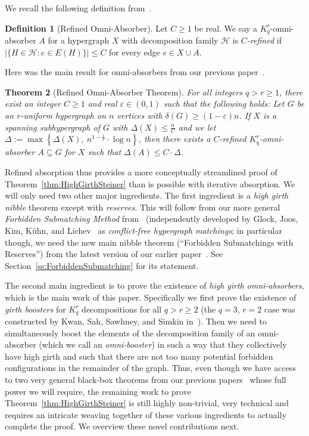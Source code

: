 \documentclass[11pt]{article}
\newcounter{i}
\theoremstyle{plain}
\newtheorem{thm}{Theorem}[section]
\theoremstyle{plain} %
\theoremstyle{definition}
\newtheorem{definition}[thm]{Definition}
\begin{document}
We recall the following definition from~\cite{DPI}.

\begin{definition}[Refined Omni-Absorber]
 Let $C\ge 1$ be real. We say a $K_q^r$-omni-absorber $A$ for a hypergraph $X$ with decomposition family $\mathcal{H}$ is \emph{$C$-refined} if $|\{H\in \mathcal{H} : e\in E(H) \}| \le C$ for every edge $e\in X\cup A$.
\end{definition}

Here was the main result for omni-absorbers from our previous paper~\cite{DPI}.

\begin{thm}[Refined Omni-Absorber Theorem]\label{thm:Omni}
For all integers $q > r\ge 1$, there exist an integer $C\ge 1$ and real $\varepsilon\in (0,1)$ such that the following holds: Let $G$ be an $r$-uniform hypergraph on $n$ vertices with $\delta(G)\ge (1-\varepsilon)n$. If $X$ is a spanning subhypergraph of $G$ with $\Delta(X) \le \frac{n}{C}$ and we let $\Delta:= \max\left\{\Delta(X),~n^{1-\frac{1}{r}}\cdot \log n\right\}$, then there exists a $C$-refined $K_q^r$-omni-absorber $A\subseteq G$ for $X$ such that $\Delta(A)\le C \cdot \Delta$. 
\end{thm}

Refined absorption thus provides a more conceptually streamlined proof of Theorem~\ref{thm:HighGirthSteiner} than is possible with iterative absorption. We will only need two other major ingredients. The first ingredient is a \emph{high girth nibble} theorem except with \emph{reserves}. This will follow from our more general \emph{Forbidden Submatching Method} from~\cite{DP22} (independently developed by Glock, Joos, Kim, K\"{u}hn, and Lichev~\cite{GJKKL22} as \emph{conflict-free hypergraph matchings}; in particular though, we need the new main nibble theorem (``Forbidden Submatchings with Reserves'') from the latest version of our earlier paper~\cite{DP22}. See Section~\ref{ss:ForbiddenSubmatching} for its statement.

The second main ingredient is to prove the existence of \emph{high girth omni-absorbers}, which is the main work of this paper. Specifically we first prove the existence of \emph{girth boosters} for $K_q^r$ decompositions for all $q > r \ge 2$ (the $q=3$, $r=2$ case was constructed by Kwan, Sah, Sawhney, and Simkin in~\cite{KSSS22}). Then we need to simultaneously boost the elements of the decomposition family of an omni-absorber (which we call an \emph{omni-booster}) in such a way that they collectively have high girth and such that there are not too many potential forbidden configurations in the remainder of the graph. Thus, even though we have access to two very general black-box theorems from our previous papers~\cite{DP22, DPI} whose full power we will require, the remaining work to prove Theorem~\ref{thm:HighGirthSteiner} is still highly non-trivial, very technical and requires an intricate weaving together of these various ingredients to actually complete the proof. We overview these novel contributions next. 
\end{document}
